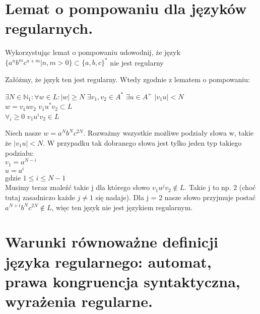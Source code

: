 \documentclass[main.tex]{subfiles}
\begin{document}
    \newpage

    \section{Lemat o pompowaniu dla języków regularnych.}
    \begin{exercise}
        Wykorzystując lemat o pompowaniu udowodnij, że język $\{a^n b^m c^{n+m} | n, m > 0\} \subset \{a, b, c\}^*$ nie jest regularny
    \end{exercise}

    \noindent Załóżmy, że język ten jest regularny. Wtedy zgodnie z lematem o pompowaniu:
    \begin{center}
        $\exists N \in \mathbb{N}_1 : \forall w \in L : |w| \geq N$ $\exists v_1, v_2 \in A^*$ $\exists u \in A^+$ $|v_1 u| < N$ \\
        $w = v_1 u v_2$   $v_1 u^* v_2 \subset L$ \\
        $\forall_i \geq 0$    $v_1 u^i v_2 \in L$
    \end{center}

    \noindent Niech nasze $w = a^N b^N c^{2N}$. Rozważmy wszystkie możliwe podziały słowa w, takie że $|v_1 u| < N$. W przypadku tak dobranego słowa jest tylko jeden typ takiego podziału: \\
    \noindent $v_1 = a^{N-i}$ \\
    \noindent $u = a^i$ \\
    \noindent gdzie $1 \leq i \leq N-1$ \\

    \noindent Musimy teraz znaleźć takie j dla którego słowo $v_1 u^j v_2 \notin L$. Takie j to np. 2 (choć tutaj zasadniczo każde $j \neq 1$ się nadaje).
    Dla j = 2 nasze słowo przyjmuje postać $a^{N+i} b^N c^{2N} \notin L$, więc ten język nie jest językiem regularnym.

    \newpage
    \section{Warunki równoważne definicji języka regularnego: automat, prawa kongruencja syntaktyczna, wyrażenia regularne.}
\end{document}
